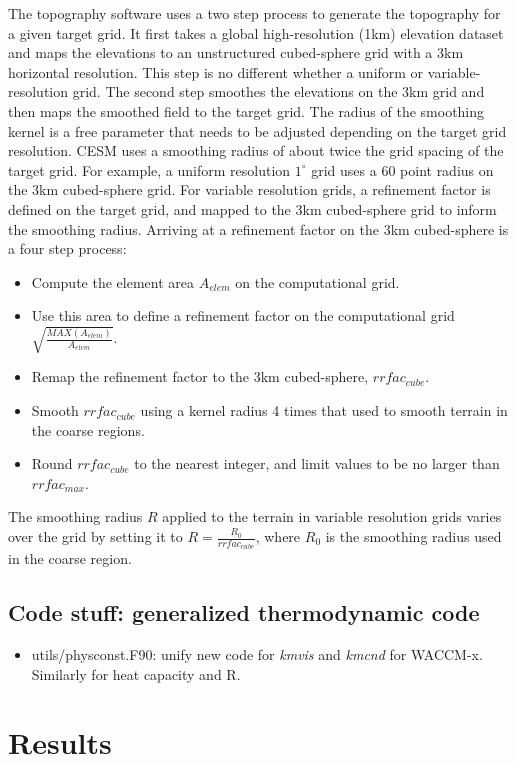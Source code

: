 \documentclass[draft]{agujournal2019}
\begin{document}
The topography software uses a two step process to generate the topography for a given target grid. It first takes a global high-resolution (1km) elevation dataset and maps the elevations to an unstructured cubed-sphere grid with a 3km horizontal resolution. This step is no different whether a uniform or variable-resolution grid. The second step smoothes the elevations on the 3km grid and then maps the smoothed field to the target grid. The radius of the smoothing kernel is a free parameter that needs to be adjusted depending on the target grid resolution. CESM uses a smoothing radius of about twice the grid spacing of the target grid. For example, a uniform resolution $1^{\circ}$ grid uses a 60 point radius on the 3km cubed-sphere grid. For variable resolution grids, a refinement factor is defined on the target grid, and mapped to the 3km cubed-sphere grid to inform the smoothing radius. Arriving at a refinement factor on the 3km cubed-sphere is a four step process:
\begin{itemize}
\item Compute the element area $A_{elem}$ on the computational grid.
\item Use this area to define a refinement factor on the computational grid $\sqrt{\frac{MAX(A_{elem})}{A_{elem}}}$.
\item Remap the refinement factor to the 3km cubed-sphere, $rrfac_{cube}$.
\item Smooth $rrfac_{cube}$ using a kernel radius 4 times that used to smooth terrain in the coarse regions.
\item Round $rrfac_{cube}$ to the nearest integer, and limit values to be no larger than $rrfac_{max}$.
\end{itemize}

The smoothing radius $R$ applied to the terrain in variable resolution grids varies over the grid by setting it to $R=\frac{R_{0}}{rrfac_{cube}}$, where $R_0$ is the smoothing radius used in the coarse region.

\subsection{Code stuff: generalized thermodynamic code}
\begin{itemize}
\item utils/physconst.F90: unify new code for {\em{kmvis}} and {\em{kmcnd}} for WACCM-x. Similarly for heat capacity and R.
\end{itemize}
\section{Results}
\end{document}

